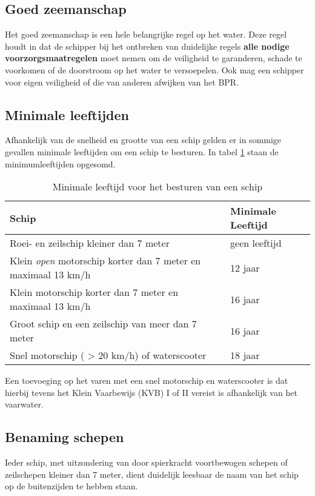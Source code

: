 \subsection{Goed zeemanschap}
Het goed zeemanschap is een hele belangrijke regel op het water. Deze regel houdt in dat de schipper bij het ontbreken van duidelijke regels \textbf{alle nodige voorzorgsmaatregelen} moet nemen om de veiligheid te garanderen, schade te voorkomen of de doorstroom op het water te versoepelen. Ook mag een schipper voor eigen veiligheid of die van anderen afwijken van het BPR.


\subsection{Minimale leeftijden}
Afhankelijk van de snelheid en grootte van een schip gelden er in sommige gevallen minimale leeftijden om een schip te besturen. In tabel \ref{tab:leeftijd} staan de minimumleeftijden opgesomd. 

\begin{table}[h]
	\centering
	\caption{Minimale leeftijd voor het besturen van een schip}
	\label{tab:leeftijd}
	\begin{tabular}{l|l}
		\textbf{Schip} & \textbf{Minimale Leeftijd} \\ \hline
		Roei- en zeilschip kleiner dan 7 meter			& geen leeftijd \\
		Klein \textit{open} motorschip korter dan 7 meter en maximaal 13 km/h & 12 jaar \\
		Klein motorschip korter dan 7 meter en maximaal 13 km/h & 16 jaar \\
		Groot schip en een zeilschip van meer dan 7 meter & 16 jaar \\
		Snel motorschip ( > 20 km/h) of waterscooter & 18 jaar
		
	\end{tabular}
\end{table}
Een toevoeging op het varen met een snel motorschip en waterscooter is dat hierbij tevens het Klein Vaarbewijs (KVB) I of II vereist is afhankelijk van het vaarwater.

\subsection{Benaming schepen}
Ieder schip, met uitzondering van door spierkracht voortbewogen schepen of zeilschepen kleiner dan 7 meter, dient duidelijk leesbaar de naam van het schip op de buitenzijden te hebben staan.

